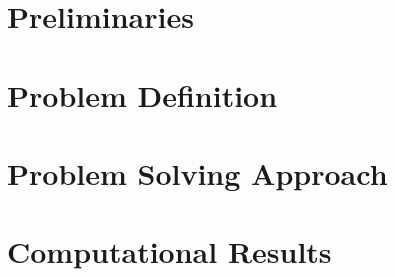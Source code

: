 \documentclass[a4paper,11pt,twoside]{memoir}
\begin{document}
\chapter{Preliminaries}
\label{ch:prelim}


\chapter{Problem Definition}
\label{ch:problem}
%
%
%

\chapter{Problem Solving Approach}
\label{ch:approach}


\chapter{Computational Results}
\label{ch:results}

%
%
%
%




\nocite{gebhard-12}
\nocite{fritz-11}
\nocite{leitner-06}

\appendix



\end{document}
